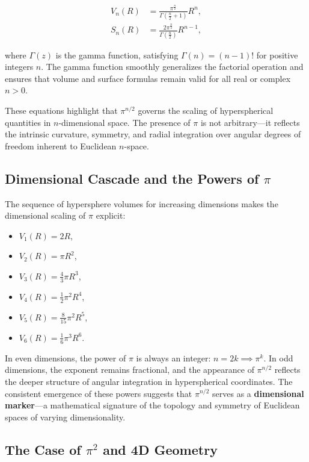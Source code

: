\documentclass[12pt,a4paper]{article}
\begin{document}
\begin{align}
V_n(R) &= \frac{\pi^{\frac{n}{2}}}{\Gamma\left( \frac{n}{2} + 1 \right)} R^n, \label{eq:hypersphere-volume} \\
S_n(R) &= \frac{2 \pi^{\frac{n}{2}}}{\Gamma\left( \frac{n}{2} \right)} R^{n-1}, \label{eq:hypersphere-surface}
\end{align}

where \(\Gamma(z)\) is the gamma function, satisfying \(\Gamma(n) = (n - 1)!\) for positive integers \(n\). The gamma function smoothly generalizes the factorial operation and ensures that volume and surface formulas remain valid for all real or complex \(n > 0\).

These equations highlight that \(\pi^{n/2}\) governs the scaling of hyperspherical quantities in \(n\)-dimensional space. The presence of \(\pi\) is not arbitrary—it reflects the intrinsic curvature, symmetry, and radial integration over angular degrees of freedom inherent to Euclidean \(n\)-space.

\subsection{Dimensional Cascade and the Powers of \(\pi\)}

The sequence of hypersphere volumes for increasing dimensions makes the dimensional scaling of \(\pi\) explicit:

\begin{itemize}
 \item \(V_1(R) = 2 R\),
 \item \(V_2(R) = \pi R^2\),
 \item \(V_3(R) = \frac{4}{3} \pi R^3\),
 \item \(V_4(R) = \frac{1}{2} \pi^2 R^4\),
 \item \(V_5(R) = \frac{8}{15} \pi^2 R^5\),
 \item \(V_6(R) = \frac{1}{6} \pi^3 R^6\).
\end{itemize}

In even dimensions, the power of \(\pi\) is always an integer: \(n = 2k \implies \pi^k\). In odd dimensions, the exponent remains fractional, and the appearance of \(\pi^{n/2}\) reflects the deeper structure of angular integration in hyperspherical coordinates. The consistent emergence of these powers suggests that \(\pi^{n/2}\) serves as a \textbf{dimensional marker}—a mathematical signature of the topology and symmetry of Euclidean spaces of varying dimensionality.

\subsection{The Case of \(\pi^2\) and 4D Geometry}
\end{document}
